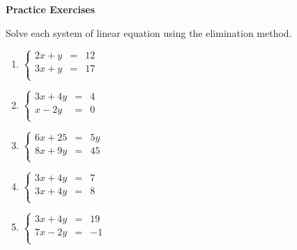 \textbf{Practice Exercises}

\vspce

Solve each system of linear equation using the elimination method. 
\begin{enumerate}[label = \arabic*. ]
\item \hspce $
\left\{
\begin{array}{ccl}
2x+y & = & 12 \\
3x+y & = & 17 \\
\end{array}
\right. $
\vspce
\item \hspce $
\left\{
\begin{array}{ccl}
3x+4y & = & 4 \\
x-2y & = & 0 \\
\end{array}
\right. $
\vspce
\item \hspce $
\left\{
\begin{array}{ccl}
6x+25 & = & 5y \\
8x+9y & = & 45 \\
\end{array}
\right. $
\vspce
\item \hspce $
\left\{
\begin{array}{ccl}
3x+4y & = & 7 \\
3x+4y & = & 8 \\
\end{array}
\right. $
\vspce
\item \hspce $
\left\{
\begin{array}{ccl}
3x+4y & = & 19 \\
7x-2y & = & -1 \\
\end{array}
\right. $
\end{enumerate} 